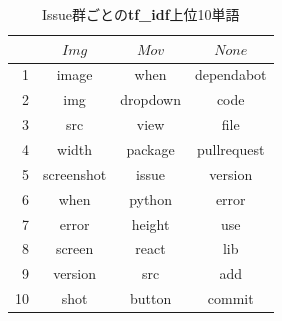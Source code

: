 \begin{table}[t]
  \begin{center}
  \caption{Issue群ごとの\textbf{tf\_idf}上位10単語}
  \begin{tabular}{r | c c c }
     & $Img$ & $Mov$ & $None$\\
    \hline \hline
    1 & image & when & dependabot\\
    2 & img & dropdown & code\\
    3 & src & view & file\\
    4 & width & package & pullrequest\\
    5 & screenshot & issue & version\\
    6 & when & python & error\\
    7 & error & height & use\\
    8 & screen & react & lib\\
    9 & version & src & add\\
    10& shot & button & commit\\
  \end{tabular}\\
  \label{tf-idf_result}
  \end{center}
\end{table}